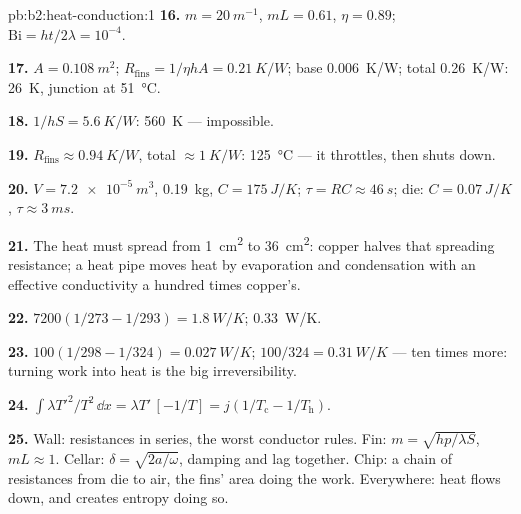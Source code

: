\begin{solution}{pb:b2:heat-conduction:1}
\textbf{16.} $m = \qty{20}{m^{-1}}$, $mL = 0.61$, $\eta = 0.89$; $\mathrm{Bi} = ht/2\lambda
= 10^{-4}$.

\textbf{17.} $A = \qty{0.108}{m^2}$; $R_{\text{fins}} = 1/\eta hA = \qty{0.21}{K/W}$; base
\qty{0.006}{K/W}; total \qty{0.26}{K/W}: \qty{26}{K}, junction at \qty{51}{\celsius}.

\textbf{18.} $1/hS = \qty{5.6}{K/W}$: \qty{560}{K} --- impossible.

\textbf{19.} $R_{\text{fins}} \approx \qty{0.94}{K/W}$, total $\approx \qty{1}{K/W}$:
\qty{125}{\celsius} --- it throttles, then shuts down.

\textbf{20.} $V = \qty{7.2e-5}{m^3}$, \qty{0.19}{kg}, $C = \qty{175}{J/K}$; $\tau = RC
\approx \qty{46}{s}$; die: $C = \qty{0.07}{J/K}$, $\tau \approx \qty{3}{ms}$.

\textbf{21.} The heat must spread from \qty{1}{cm^2} to \qty{36}{cm^2}: copper
halves that spreading resistance; a heat pipe moves heat by
evaporation and condensation with an effective conductivity a hundred
times copper's.

\textbf{22.} $7200(1/273 - 1/293) = \qty{1.8}{W/K}$; \qty{0.33}{W/K}.

\textbf{23.} $100(1/298 - 1/324) = \qty{0.027}{W/K}$; $100/324 = \qty{0.31}{W/K}$ ---
ten times more: turning work into heat is the big irreversibility.

\textbf{24.} $\int\lambda T'^2/T^2\,\dd x = \lambda T'\,[-1/T] = j(1/T_{\text{c}} -
1/T_{\text{h}})$.

\textbf{25.} Wall: resistances in series, the worst conductor rules.
Fin: $m = \sqrt{hp/\lambda S}$, $mL \approx 1$. Cellar: $\delta = \sqrt{2a/\omega}$,
damping and lag together. Chip: a chain of resistances from die to
air, the fins' area doing the work. Everywhere: heat flows down, and
creates entropy doing so.
\end{solution}

